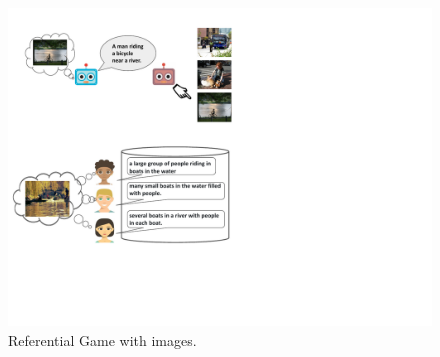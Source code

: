\documentclass{article}
\begin{document}
\begin{figure}
\includegraphics[width=\linewidth]{figs/game-image.pdf}
\vspace{-6mm}
\caption{Referential Game with images.}
\label{fig:game-image}
\end{figure}
\end{document}

